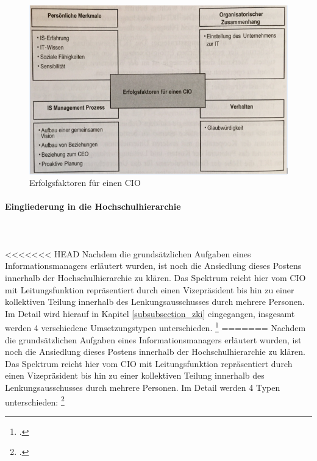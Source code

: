 \begin{figure}[h!]
	\centering
	\includegraphics[width=15cm]{kapitel/gruppe1_2/bilder/erfolgsfaktoren_cio} 
	\caption{Erfolgsfaktoren für einen CIO\protect\footnotemark}
	\label{efec}
\end{figure}

\paragraph{Eingliederung in die Hochschulhierarchie}\mbox{}\\\\
<<<<<<< HEAD
Nachdem die grundsätzlichen Aufgaben eines Informationsmanagers erläutert wurden, ist noch die Ansiedlung dieses Postens innerhalb der Hochschulhierarchie zu klären. Das Spektrum reicht hier vom CIO mit Leitungsfunktion repräsentiert durch einen Vizepräsident bis hin zu einer kollektiven Teilung innerhalb des Lenkungsausschusses durch mehrere Personen. Im Detail wird hierauf in Kapitel \ref{subsubsection_zki} eingegangen, insgesamt werden 4 verschiedene Umsetzungstypen unterschieden. \footcite[Vgl.][10]{leitner_itil_2008}
=======
\label{anforderungsprofil_informationsmanager}
Nachdem die grundsätzlichen Aufgaben eines Informationsmanagers erläutert wurden, ist noch die Ansiedlung dieses Postens innerhalb der Hochschulhierarchie zu klären. Das Spektrum reicht hier vom CIO mit Leitungsfunktion repräsentiert durch einen Vizepräsident bis hin zu einer kollektiven Teilung innerhalb des Lenkungsausschusses durch mehrere Personen. Im Detail werden 4 Typen unterschieden: \footcite[Vgl.][10]{leitner_itil_2008}

